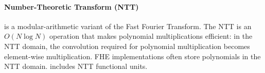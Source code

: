 \begin{comment}
Second, RNS makes it easy to drop unneeded bits from each coefficient as multiplicative budget decreases
by dropping residue polynomials.
This allows us to implement efficient wide arithmetic on a broad range of widths
while supporting a single, narrow width in hardware.
\end{comment}


\paragraph{Number-Theoretic Transform (NTT)} is a modular-arithmetic variant of the Fast Fourier Transform.
The NTT is an $O(N\log N)$ operation
that makes polynomial multiplications efficient:
in the NTT domain, the convolution required for polynomial multiplication becomes element-wise multiplication.
FHE implementations often store polynomials in the NTT domain.
\name includes NTT functional units.

%

